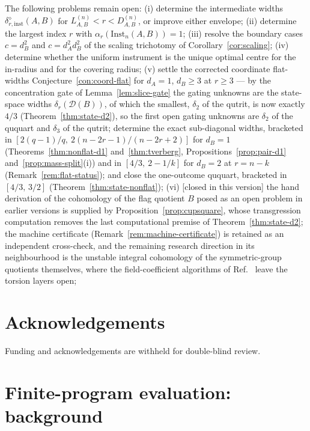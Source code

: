 \documentclass[11pt,a4paper]{article}
\newcommand{\Inst}{\mathrm{Inst}}
\begin{document}
The following problems remain open: (i) determine the intermediate widths $\delta_{r,\mathrm{inst}}^{\diamond}(A,B)$ for $L_{A,B}^{(n)}<r<D_{A,B}^{(n)}$, or improve either envelope; (ii) determine the largest index $r$ with $\alpha_r(\Inst_n(A,B))=1$; (iii) resolve the boundary cases $c=d_B^2$ and $c=d_A^2d_B^2$ of the scaling trichotomy of Corollary~\ref{cor:scaling}; (iv) determine whether the uniform instrument is the unique optimal centre for the in-radius and for the covering radius; (v) settle the corrected coordinate flat-widths Conjecture~\ref{con:coord-flat} for $d_A=1$, $d_B\ge3$ at $r\ge3$ --- by the concentration gate of Lemma~\ref{lem:slice-gate} the gating unknowns are the state-space widths $\delta_r(\mathcal D(B))$, of which the smallest, $\delta_2$ of the qutrit, is now exactly $4/3$ (Theorem~\ref{thm:state-d2}), so the first open gating unknowns are $\delta_2$ of the ququart and $\delta_3$ of the qutrit; determine the exact sub-diagonal widths, bracketed in $[2(q-1)/q,\ 2(n-2r-1)/(n-2r+2)]$ for $d_B=1$ (Theorems~\ref{thm:nonflat-d1} and~\ref{thm:tverberg}, Propositions~\ref{prop:pair-d1} and~\ref{prop:mass-split}(i)) and in $[4/3,\ 2-1/k]$ for $d_B=2$ at $r=n-k$ (Remark~\ref{rem:flat-status}); and close the one-outcome ququart, bracketed in $[4/3,\,3/2]$ (Theorem~\ref{thm:state-nonflat}); (vi) [closed in this version] the hand derivation of the cohomology of the flag quotient $B$ posed as an open problem in earlier versions is supplied by Proposition~\ref{prop:cupsquare}, whose transgression computation removes the last computational premise of Theorem~\ref{thm:state-d2}; the machine certificate (Remark~\ref{rem:machine-certificate}) is retained as an independent cross-check, and the remaining research direction in its neighbourhood is the unstable integral cohomology of the symmetric-group quotients themselves, where the field-coefficient algorithms of Ref.~\cite{GuerraJana2025} leave the torsion layers open;

\section*{Acknowledgements}
Funding and acknowledgements are withheld for double-blind review.

\appendix

\section{Finite-program evaluation: background}
\label{app:no-programming}
\end{document}
